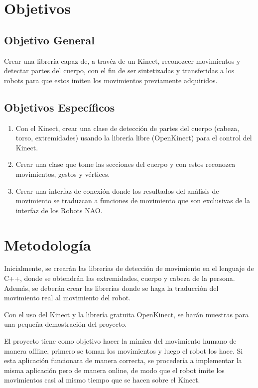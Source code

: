 \documentclass[letterpaper]{article}
\begin{document}
\section{Objetivos}

\subsection{Objetivo General}

Crear una librería capaz de, a travéz de un Kinect, reconozcer movimientos y detectar partes del cuerpo, con el fin de ser sintetizadas y transferidas a los robots para que estos imiten los movimientos previamente adquiridos.\\

\subsection{Objetivos Específicos}


\begin{enumerate}
\item Con el Kinect, crear una clase de detección de partes del cuerpo (cabeza, torso, extremidades) usando la librería libre (OpenKinect) para el control del Kinect.
\item Crear una clase que tome las secciones del cuerpo y con estos reconozca movimientos, gestos y vértices.
\item Crear una interfaz de conexión donde los resultados del análisis de movimiento se traduzcan a funciones de movimiento que son exclusivas de la interfaz de los Robots NAO.
 
\end{enumerate}

\section{Metodología}

Inicialmente, se crearán las librerías de detección de movimiento en el lenguaje de C++, donde se obtendrán las extremidades, cuerpo y cabeza de la persona. Además, se deberán crear las librerías donde se haga la traducción del movimiento real al movimiento del robot.

Con el uso del Kinect y la librería gratuita OpenKinect, se harán muestras para una pequeña demostración del proyecto.

El proyecto tiene como objetivo hacer la mímica del movimiento humano de manera offline, primero se toman los movimientos y luego el robot los hace. Si esta aplicación funcionara de manera correcta, se procedería a implementar la misma aplicación pero de manera online, de modo que el robot imite los movimientos casi al mismo tiempo que se hacen sobre el Kinect.
\end{document}
